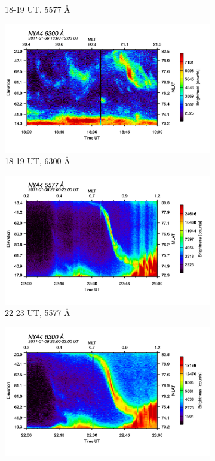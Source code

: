 \documentclass[10pt,a4paper]{article}
\begin{document}
\begin{figure}[h]
\begin{subfigure}{.5\textwidth}
		\caption{18-19 UT, 5577 Å}
		\label{fig:sfig3}
	\end{subfigure}
	\begin{subfigure}{.5\textwidth}
		\centering
		\includegraphics[width=.8\linewidth]{am-1819-6300.png}
		\caption{18-19 UT, 6300 Å}
		\label{fig:sfig4}
	\end{subfigure}
	\begin{subfigure}{.5\textwidth}
		\centering
		\includegraphics[width=.8\linewidth]{am-2223-5577.png}
		\caption{22-23 UT, 5577 Å}
		\label{fig:sfig5}
	\end{subfigure}
	\begin{subfigure}{.5\textwidth}
		\centering
		\includegraphics[width=.8\linewidth]{am-2223-6300.png}

\end{subfigure}
\end{figure}
\end{document}
